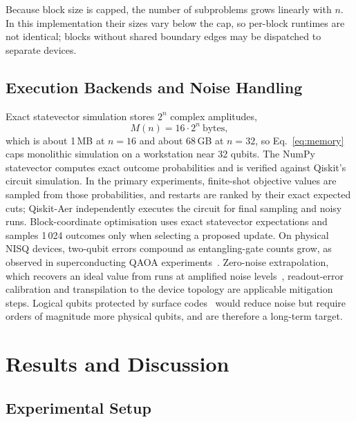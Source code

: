 \documentclass[pdflatex,sn-mathphys-num]{sn-jnl}
\theoremstyle{thmstyleone}
\theoremstyle{thmstyletwo}
\theoremstyle{thmstylethree}
\begin{document}
Because block size is capped, the number of subproblems grows linearly with $n$. In this implementation their sizes vary below the cap, so per-block runtimes are not identical; blocks without shared boundary edges may be dispatched to separate devices.

\subsection{Execution Backends and Noise Handling}\label{sec:backends}

Exact statevector simulation stores $2^n$ complex amplitudes,
\begin{equation}
  M(n) = 16\cdot 2^{n}\ \text{bytes},
  \label{eq:memory}
\end{equation}
which is about 1\,MB at $n=16$ and about 68\,GB at $n=32$, so Eq.~\eqref{eq:memory} caps monolithic simulation on a workstation near 32 qubits. The NumPy statevector computes exact outcome probabilities and is verified against Qiskit's circuit simulation. In the primary experiments, finite-shot objective values are sampled from those probabilities, and restarts are ranked by their exact expected cuts; Qiskit-Aer independently executes the circuit for final sampling and noisy runs. Block-coordinate optimisation uses exact statevector expectations and samples 1\,024 outcomes only when selecting a proposed update. On physical NISQ devices, two-qubit errors compound as entangling-gate counts grow, as observed in superconducting QAOA experiments~\cite{harrigan2021quantum}. Zero-noise extrapolation, which recovers an ideal value from runs at amplified noise levels~\cite{temme2017error}, readout-error calibration and transpilation to the device topology are applicable mitigation steps. Logical qubits protected by surface codes~\cite{fowler2012surface} would reduce noise but require orders of magnitude more physical qubits, and are therefore a long-term target.

\section{Results and Discussion}\label{sec:results}

\subsection{Experimental Setup}\label{sec:setup}
\end{document}
